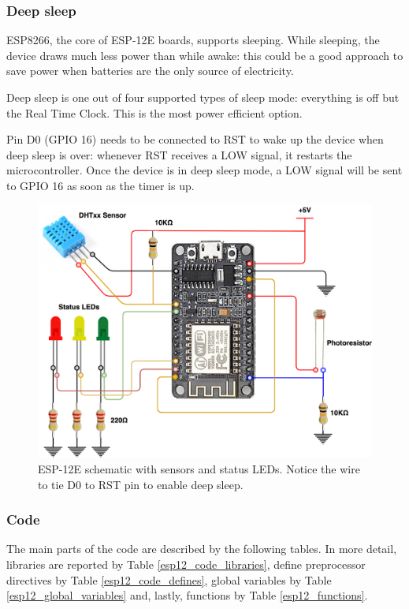 \subsubsection{Deep sleep}
ESP8266, the core of ESP-12E boards, supports sleeping. While sleeping, the device draws much less power than while awake: this could be a good approach to save power when batteries are the only source of electricity.

Deep sleep is one out of four supported types of sleep mode: everything is off but the Real Time Clock. This is the most power efficient option.

Pin D0 (GPIO 16) needs to be connected to RST to wake up the device when deep sleep is over: whenever RST receives a LOW signal, it restarts the microcontroller. Once the device is in deep sleep mode, a LOW signal will be sent to GPIO 16 as soon as the timer is up.

\begin{figure}[H]
	\begin{center}
		\includegraphics[width=\textwidth]{./pictures/ESP-12E_wiring.png}
		\caption{ESP-12E schematic with sensors and status LEDs. Notice the wire to tie D0 to RST pin to enable deep sleep.}
		\label{esp12_wiring}
	\end{center}
\end{figure}

\subsubsection{Code}
The main parts of the code are described by the following tables. In more detail, libraries are reported by Table \ref{esp12_code_libraries}, define preprocessor directives by Table \ref{esp12_code_defines}, global variables by Table \ref{esp12_global_variables} and, lastly, functions by Table \ref{esp12_functions}.

